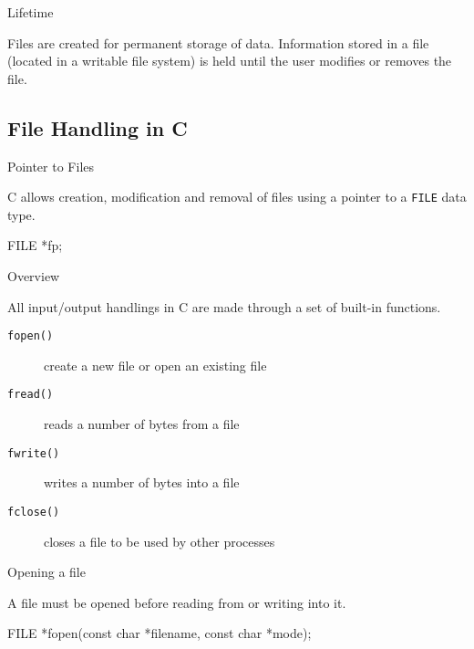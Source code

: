 \documentclass[compress]{beamer}
\begin{document}
\begin{slide}
	\begin{block}{Lifetime}

	Files are created for permanent storage of data.
	Information stored in a file (located in a writable file system) is held until the user modifies or removes the file.

	\end{block}
\end{slide}

\subsection{File Handling in C}

\begin{slide}
	\begin{block}{Pointer to Files}

	C allows creation, modification and removal of files using a pointer to a \texttt{FILE} data type.

	\begin{terminal}
	FILE *fp;
	\end{terminal}

	\end{block}
\end{slide}

\begin{slide}
	\begin{block}{Overview}

	All input/output handlings in C are made through a set of built-in functions.

	\begin{description}
	\item[\texttt{fopen()}] create a new file or open an existing file
	\item[\texttt{fread()}] reads a number of bytes from a file
	\item[\texttt{fwrite()}] writes a number of bytes into a file
	\item[\texttt{fclose()}] closes a file to be used by other processes
	\end{description}

	\end{block}
\end{slide}

\begin{slide}
	\begin{block}{Opening a file}

	A file must be opened before reading from or writing into it.

	\begin{terminal}
	FILE *fopen(const char *filename, const char *mode);
	\end{terminal}

	\end{block}
\end{slide}
\end{document}
